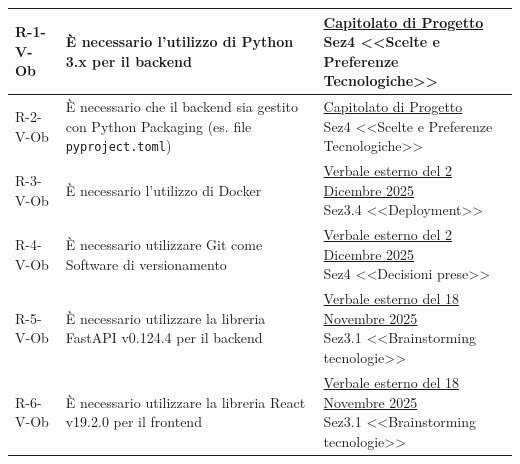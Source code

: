 ﻿\documentclass[a4paper,12pt]{article}
\begin{document}
{{\begin{longtable}{|l|p{0.4\textwidth}|p{6.8cm}|}
            \hline
            \endlastfoot
            \hline
            R-1-V-Ob        & È necessario l'utilizzo di Python 3.x per il backend                                            & \parbox[t]{\linewidth}{\href{https://www.math.unipd.it/~tullio/IS-1/2025/Progetto/C1.pdf}{Capitolato di Progetto}                                                 \\ Sez4 <<Scelte e Preferenze Tecnologiche>>} \\
            \hline
            R-2-V-Ob        & È necessario che il backend sia gestito con Python Packaging (es. file \texttt{pyproject.toml}) & \parbox[t]{\linewidth}{\href{https://www.math.unipd.it/~tullio/IS-1/2025/Progetto/C1.pdf}{Capitolato di Progetto}                                                 \\ Sez4 <<Scelte e Preferenze Tecnologiche>>} \\
            \hline
            R-3-V-Ob        & È necessario l'utilizzo di Docker                                                               & \parbox[t]{\linewidth}{\href{https://atlasteam9.github.io/Atlas/docs/RTB/verbali/esterni/firmati/VE-2025-12-02-firmato.pdf}{Verbale esterno del 2 Dicembre 2025}  \\ Sez3.4 <<Deployment>>} \\
            \hline
            R-4-V-Ob        & È necessario utilizzare Git come Software di versionamento                                      & \parbox[t]{\linewidth}{\href{https://atlasteam9.github.io/Atlas/docs/RTB/verbali/esterni/firmati/VE-2025-12-02-firmato.pdf}{Verbale esterno del 2 Dicembre 2025}  \\ Sez4 <<Decisioni prese>>} \\
            \hline
            R-5-V-Ob        & È necessario utilizzare la libreria FastAPI v0.124.4 per il backend                             & \parbox[t]{\linewidth}{\href{https://atlasteam9.github.io/Atlas/docs/RTB/verbali/esterni/firmati/VE-2025-11-18-firmato.pdf}{Verbale esterno del 18 Novembre 2025} \\ Sez3.1 <<Brainstorming tecnologie>>} \\
            \hline
            \hline
            R-6-V-Ob        & È necessario utilizzare la libreria React v19.2.0 per il frontend                               & \parbox[t]{\linewidth}{\href{https://atlasteam9.github.io/Atlas/docs/RTB/verbali/esterni/firmati/VE-2025-11-18-firmato.pdf}{Verbale esterno del 18 Novembre 2025} \\ Sez3.1 <<Brainstorming tecnologie>>} \\
        \end{longtable}
    }

}
\end{document}
